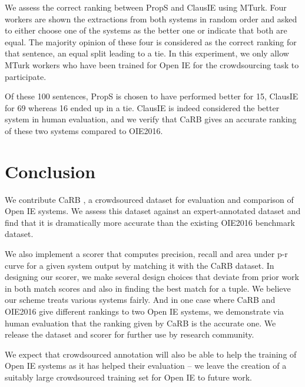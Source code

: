         We assess the correct ranking between PropS and ClausIE using MTurk. Four workers are shown the extractions from both systems in random order and asked to either choose one of the systems as the better one or indicate that both are equal. The majority opinion of these four is considered as the correct ranking for that sentence, an equal split leading to a tie. In this experiment, we only allow MTurk workers who have been trained for Open IE for the crowdsourcing task to participate.

        Of these 100 sentences, PropS is chosen to have performed better for 15, ClausIE for 69 whereas 16 ended up in a tie. ClausIE is indeed considered the better system in human evaluation, and we verify that CaRB gives an accurate ranking of these two systems compared to OIE2016. 

\section{Conclusion}
    We contribute CaRB \citep{bhardwaj&al19}, a crowdsourced dataset for evaluation and comparison of Open IE systems. We assess this dataset against an expert-annotated dataset and find that it is dramatically more accurate than the existing OIE2016 benchmark dataset. 

    We also implement a scorer that computes precision, recall and area under p-r curve for a given system output by matching it with the CaRB dataset. In designing our scorer, we make several design choices that deviate from prior work in both match scores and also in finding the best match for a tuple. We believe our scheme treats various systems fairly. And in one case where CaRB and OIE2016 give different rankings to two Open IE systems, we demonstrate via human evaluation that the ranking given by CaRB is the accurate one. We release the dataset and scorer for further use by research community. 

    We expect that crowdsourced annotation will also be able to help the training of Open IE systems as it has helped their evaluation -- we leave the creation of a suitably large crowdsourced training set for Open IE to future work. 

